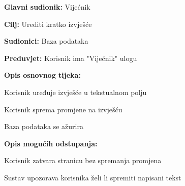 					\begin{packed_item}
	
						\item \textbf{Glavni sudionik: }Vijećnik
						\item  \textbf{Cilj:} Urediti kratko izvješće
						\item  \textbf{Sudionici:} Baza podataka
						\item  \textbf{Preduvjet:} Korisnik ima "Vijećnik" ulogu
						\item  \textbf{Opis osnovnog tijeka:}
						
						\item[] \begin{packed_enum}
	
							\item Korisnik uređuje izvješće u tekstualnom polju 
							\item Korisnik sprema promjene na izvješću
							\item Baza podataka se ažurira
							
							
							
						\end{packed_enum}
						\item  \textbf{Opis mogućih odstupanja:}
						
						\item[] \begin{packed_item}
						\item[2.a] Korisnik zatvara stranicu bez spremanja promjena
							\item[] \begin{packed_enum}
								
								\item Sustav upozorava korisnika želi li spremiti napisani tekst
								
							\end{packed_enum}
						\end{packed_item}
						
						
						
					\end{packed_item}					
					
